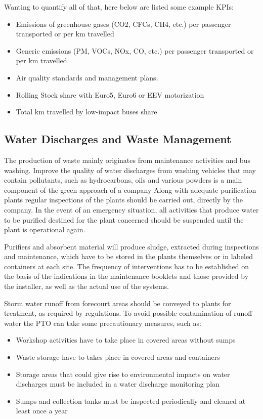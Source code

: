 Wanting to quantify all of that, here below are listed some example KPIs:
\begin{itemize}
    \item Emissions of greenhouse gases (CO2, CFCs, CH4, etc.) per passenger transported or per km travelled
    \item Generic emissions (PM, VOCs, NOx, CO, etc.) per passenger transported or per km travelled
    \item Air quality standards and management plans. 
    \item Rolling Stock share with Euro5, Euro6 or EEV motorization
    \item Total km travelled by low-impact buses share
\end{itemize}

\subsection{Water Discharges and Waste Management}
\label{subsec:water}
The production of waste mainly originates from maintenance activities and bus washing. Improve the quality of water discharges from washing vehicles that may contain pollutants, such as hydrocarbons, oils and various powders is a main component of the green approach of a company Along with adequate purification plants regular inspections of the plants should be carried out, directly by the company. In the event of an emergency situation, all activities that produce water to be purified destined for the plant concerned should be suspended until the plant is operational again.

Purifiers and absorbent material will produce sludge, extracted during inspections and maintenance, which have to be stored in the plants themselves or in labeled containers at each site. The frequency of interventions has to be established on the basis of the indications in the maintenance booklets and those provided by the installer, as well as the actual use of the systems.

Storm water runoff from forecourt areas should be conveyed to plants for treatment, as required by regulations. To avoid possible contamination of runoff water the PTO can take some precautionary measures, such as:
\begin{itemize}
    \item Workshop activities have to take place in covered areas without sumps
    \item Waste storage have to takes place in covered areas and containers
    \item Storage areas that could give rise to environmental impacts on water discharges must be included in a water discharge monitoring plan
    \item Sumps and collection tanks must be inspected periodically and cleaned at least once a year
 \end{itemize}

